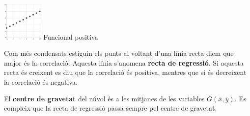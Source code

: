 \begin{theorybox}
\begin{multicols}{7}
\begin{center}
		\includegraphics[width=2cm]{img-11/dep-fp}
		Funcional positiva
		\end{center}
	\end{multicols}
	Com més condensats estiguin els punts al voltant d'una línia recta diem que major és la correlació. Aquesta línia s'anomena \textbf{recta de regressió}. Si aquesta recta és creixent es diu que la correlació és positiva, mentres que si és decreixent la correlació és negativa.
	
	El \textbf{centre de gravetat} del núvol és a les mitjanes de les variables $G(\bar x, \bar y)$. Es compleix que la recta de regressió passa sempre pel centre de gravetat.
\end{theorybox}	

